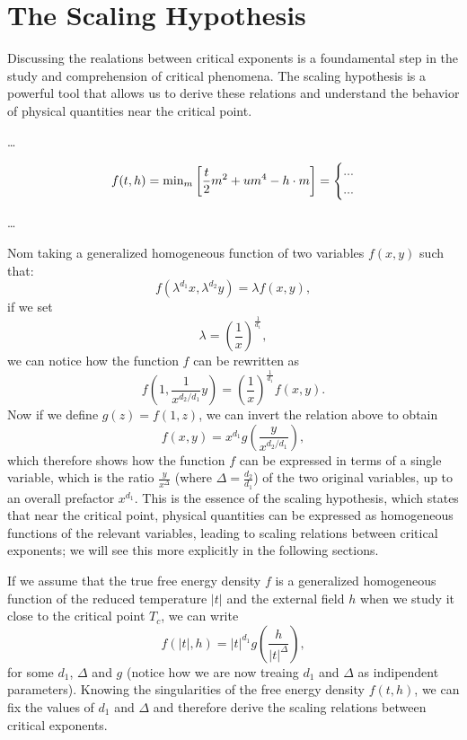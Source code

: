 \section{The Scaling Hypothesis}

Discussing the realations between critical exponents is a foundamental step in the study and comprehension of critical phenomena. The scaling hypothesis is a powerful tool that allows us to derive these relations and understand the behavior of physical quantities near the critical point.

\dots

\[
    f(t,h) = \text{min}_m \left[ \frac{t}{2}m^2 + u m^4 - h \cdot m \right] = \begin{dcases}
        ... \\
        ...
    \end{dcases}
\]

\dots

Nom taking a generalized homogeneous function of two variables \(f(x,y)\) such that:
\[
    f(\lambda^{d_1} x, \lambda^{d_2} y) = \lambda f(x,y),
\]
if we set
\[
    \lambda = \left(\frac{1}{x}\right)^{\frac{1}{d_1}},
\]
we can notice how the function \(f\) can be rewritten as
\[
    f(1, \frac{1}{x^{d_2/d_1}} y) = \left(\frac{1}{x}\right)^{\frac{1}{d_1}} f(x,y).
\]
Now if we define \(g(z)=f(1,z)\), we can invert the relation above to obtain
\[
    f(x,y) = x^{d_1} g\left(\frac{y}{x^{d_2/d_1}}\right),
\]
which therefore shows how the function \(f\) can be expressed in terms of a single variable, which is the ratio \(\frac{y}{x^{\Delta}}\) (where \(\Delta = \frac{d_2}{d_1}\)) of the two original variables, up to an overall prefactor \(x^{d_1}\). This is the essence of the scaling hypothesis, which states that near the critical point, physical quantities can be expressed as homogeneous functions of the relevant variables, leading to scaling relations between critical exponents; we will see this more explicitly in the following sections.

If we assume that the true free energy density \(f\) is a generalized homogeneous function of the reduced temperature \(\vert t \vert\) and the external field \(h\) when we study it close to the critical point \(T_c\), we can write
\[
    f(\vert t \vert, h) = \vert t \vert^{d_1} g\left(\frac{h}{\vert t \vert^{\Delta}}\right),
\]
for some \(d_1\), \(\Delta\) and \(g\) (notice how we are now treaing \(d_1\) and \(\Delta\) as indipendent parameters). Knowing the singularities of the free energy density \(f(t,h)\), we can fix the values of \(d_1\) and \(\Delta\) and therefore derive the scaling relations between critical exponents.

